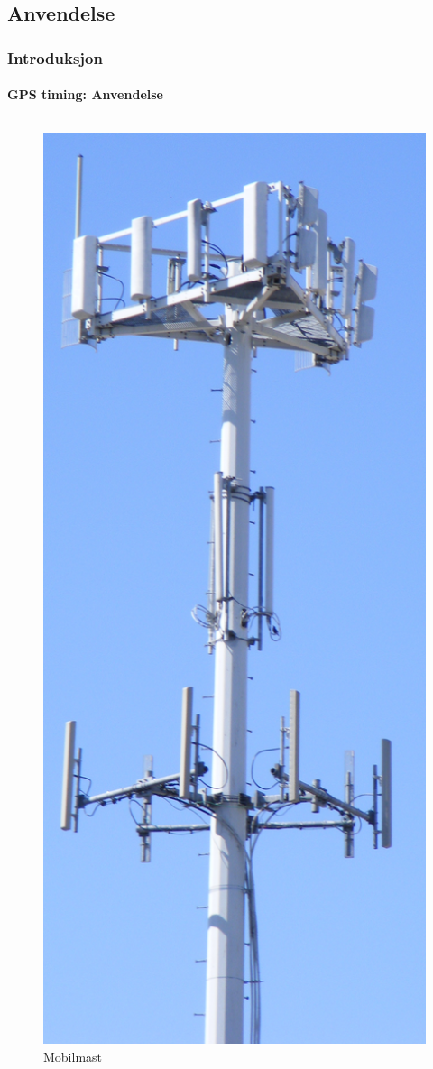 \documentclass[xcolor=table]{beamer}
\begin{document}
\subsection{Anvendelse}
\begin{frame}
  \frametitle{Introduksjon}
\framesubtitle{GPS timing: Anvendelse}
  \begin{columns}
          \hspace{-50pt}
      \begin{figure}
        \includegraphics[scale=0.045]{thesis/graphics/Cell-Tower.jpg}
        \caption{Mobilmast \cite{CELLTOWER}}
      \end{figure}


\end{columns}
\end{frame}
\end{document}
